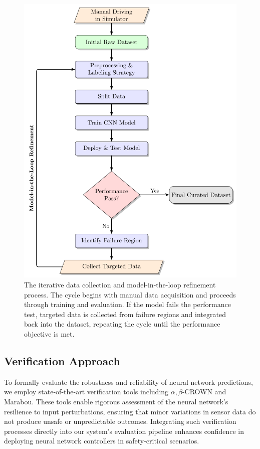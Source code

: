 %
 \begin{figure}[h]
 \centering
 \includegraphics[width=0.8\linewidth]{figures/flow_chart.pdf}
 \caption{The iterative data collection and model-in-the-loop refinement process. The cycle begins with manual data acquisition and proceeds through training and evaluation. If the model fails the performance test, targeted data is collected from failure regions and integrated back into the dataset, repeating the cycle until the performance objective is met.}
 \label{fig:simulator}
 \end{figure}


\subsection{Verification Approach}\label{sec:verificationApproach}

  To formally evaluate the robustness and reliability of neural network predictions, we employ state-of-the-art verification tools including \(\alpha,\beta\)-CROWN and Marabou. These tools enable rigorous assessment of the neural network's resilience to input perturbations, ensuring that minor variations in sensor data do not produce unsafe or unpredictable outcomes. Integrating such verification processes directly into our system's evaluation pipeline enhances confidence in deploying neural network controllers in safety-critical scenarios.



  